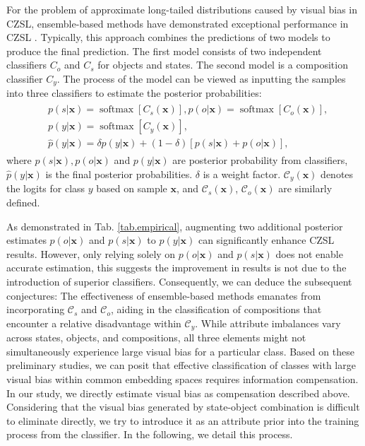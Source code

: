 \documentclass[letterpaper]{article} %
\newcommand{\mx}{\mathbf{x}}
\theoremstyle{definition}
\begin{document}
For the problem of approximate long-tailed distributions caused by visual bias in CZSL, ensemble-based methods have demonstrated exceptional performance in CZSL \cite{saini2022disentangling, wang2023learning}. Typically, this approach combines the predictions of two models to produce the final prediction. The first model consists of two independent classifiers $C_o$ and $C_s$ for objects and states. The second model is a composition classifier $C_y$. The process of the model can be viewed as inputting the samples into three classifiers to estimate the posterior probabilities:
	\begin{equation}
	\begin{split}
    \begin{aligned}
	&p(s|\mx) = \operatorname{softmax}[C_s(\mx)], p(o|\mx) = \operatorname{softmax}[C_o(\mx)],\\ &p(y|\mx) = \operatorname{softmax}[C_y(\mx)],\\ &\hat{p}(y|\mx) =  \delta p(y|\mx)+ (1-\delta)\left [p(s|\mx)+p(o|\mx)\right ],
    \end{aligned}
	\end{split}
    \label{eq1}
	\end{equation}
where $p(s|\mx),p(o|\mx)$ and $p(y|\mx)$ are posterior probability from classifiers, $\hat{p}(y|\mx)$ is the final posterior probabilities. $\delta$ is a weight factor. $\mathcal{C}_{y}(\mx)$ denotes the logits for class $y$ based on sample $\mx$, and $\mathcal{C}_{s}(\mx)$, $\mathcal{C}_{o}(\mx)$ are similarly defined.

As demonstrated in Tab. \ref{tab.empirical}, augmenting two additional posterior estimates $p(o|\mx)$ and $p(s|\mx)$ to $p(y|\mx)$ can significantly enhance CZSL results. However, only relying solely on $p(o|\mx)$ and $p(s|\mx)$ does not enable accurate estimation, this suggests the improvement in results is not due to the introduction of superior classifiers. Consequently, we can deduce the subsequent conjectures: The effectiveness of ensemble-based methods emanates from incorporating $\mathcal{C}_{s}$ and $\mathcal{C}_{o}$, aiding in the classification of compositions that encounter a relative disadvantage within $\mathcal{C}_y$. While attribute imbalances vary across states, objects, and compositions, all three elements might not simultaneously experience large visual bias for a particular class. Based on these preliminary studies, we can posit that effective classification of classes with large visual bias within common embedding spaces requires information compensation. In our study, we directly estimate visual bias as compensation described above. Considering that the visual bias generated by state-object combination is difficult to eliminate directly, we try to introduce it as an attribute prior into the training process from the classifier. In the following, we detail this process.
\end{document}

